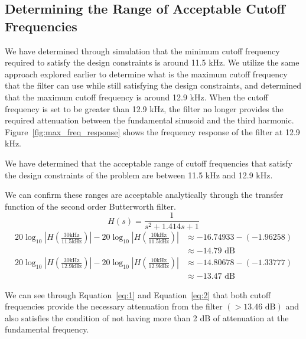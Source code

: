 \documentclass[12pt]{article}
\begin{document}
\subsection*{Determining the Range of Acceptable Cutoff Frequencies}
We have determined through simulation that the minimum cutoff frequency required to satisfy the design constraints is around 11.5 kHz. We utilize the same approach explored earlier to determine what is the maximum cutoff frequency that the filter can use while still satisfying the design constraints, and determined that the maximum cutoff frequency is around 12.9 kHz. When the cutoff frequency is set to be greater than 12.9 kHz, the filter no longer provides the required attenuation between the fundamental sinusoid and the third harmonic. Figure~\ref{fig:max_freq_response} shows the frequency response of the filter at 12.9 kHz.

We have determined that the acceptable range of cutoff frequencies that satisfy the design constraints of the problem are between 11.5 kHz and 12.9 kHz.

We can confirm these ranges are acceptable analytically through the transfer function of the second order Butterworth filter.
\begin{equation*}
    H(s) = \frac{1}{s^2 + 1.414s + 1}
\end{equation*}
\begin{equation} \label{eq:1}
\begin{aligned}
    20\log_{10}{\left|H\left(\frac{30 \text{kHz}}{11.5 \text{kHz}}\right)\right|} - 20\log_{10}{\left|H\left(\frac{10 \text{kHz}}{11.5 \text{kHz}}\right)\right|} &\approx -16.74933 - (-1.96258) \\
    &\approx -14.79 \text{ dB}
\end{aligned}
\end{equation}
\begin{equation} \label{eq:2}
\begin{aligned}
    20\log_{10}{\left|H\left(\frac{30 \text{kHz}}{12.9 \text{kHz}}\right)\right|} - 20\log_{10}{\left|H\left(\frac{10 \text{kHz}}{12.9 \text{kHz}}\right)\right|} &\approx -14.80678 - (-1.33777) \\
    &\approx -13.47 \text{ dB}
\end{aligned}
\end{equation}

We can see through Equation~\ref{eq:1} and Equation~\ref{eq:2} that both cutoff frequencies provide the necessary attenuation from the filter $(> 13.46 \text{ dB})$ and also satisfies the condition of not having more than 2 dB of attenuation at the fundamental frequency.
\end{document}
